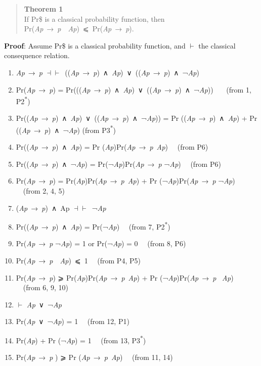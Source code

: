 \documentclass[
  10pt,
  letterpaper,
  DIV=11,
  numbers=noendperiod,
  twoside]{scrartcl}
\providecommand{\tightlist}{%
  \setlength{\itemsep}{0pt}\setlength{\parskip}{0pt}}\usepackage{longtable,booktabs,array}
\begin{document}
\begin{quote}
\textbf{Theorem 1}\\
If Pr\$ is a classical probability function, then\\
Pr(\emph{Ap}~→~\emph{p}~\textbar~\emph{Ap})~⩽~Pr(\emph{Ap}~→~\emph{p}).
\end{quote}

\textbf{Proof}: Assume Pr\$ is a classical probability function, and
\(\vdash\) the classical consequence relation.

\begin{enumerate}
\def\labelenumi{\arabic{enumi}.}
\tightlist
\item
  \emph{Ap}~→~\emph{p}
  \(\dashv \vdash\)~((\emph{Ap}~→~\emph{p})~∧~\emph{Ap})~∨~((\emph{Ap}~→~\emph{p})~∧~¬\emph{Ap})
\item
  Pr(\emph{Ap}~→~\emph{p}) =
  Pr(((\emph{Ap}~→~\emph{p})~∧~\emph{Ap})~∨~((\emph{Ap}~→~\emph{p})~∧~¬\emph{Ap}))
  ~~~(from 1, P2\textsuperscript{*})
\item
  Pr((\emph{Ap}~→~\emph{p})~∧~\emph{Ap})~∨~((\emph{Ap}~→~\emph{p})~∧~¬\emph{Ap}))
  = Pr ((\emph{Ap}~→~\emph{p})~∧~\emph{Ap}) + Pr
  ((\emph{Ap}~→~\emph{p})~∧~¬\emph{Ap}) (from P3\textsuperscript{*})
\item
  Pr((\emph{Ap}~→~\emph{p})~∧~\emph{Ap}) = Pr
  (\emph{Ap})Pr(\emph{Ap}~→~\emph{p}\textbar~\emph{Ap}) ~~(from P6)
\item
  Pr((\emph{Ap}~→~\emph{p})~∧~¬\emph{Ap}) =
  Pr(¬\emph{Ap})Pr(\emph{Ap}~→~\emph{p} \textbar¬\emph{Ap}) ~~(from P6)
\item
  Pr(\emph{Ap}~→~\emph{p}) =
  Pr(\emph{Ap})Pr(\emph{Ap}~→~\emph{p}\textbar~\emph{Ap}) + Pr
  (¬\emph{Ap})Pr(\emph{Ap}~→~\emph{p} \textbar¬\emph{Ap}) ~~(from 2, 4,
  5)
\item
  (\emph{Ap}~→~\emph{p})~∧~Ap \(\dashv \vdash\)~¬\emph{Ap}
\item
  Pr((\emph{Ap}~→~\emph{p})~∧~\emph{Ap}) = Pr(¬\emph{Ap}) ~~(from 7,
  P2\textsuperscript{*})
\item
  Pr(\emph{Ap}~→~\emph{p} \textbar¬\emph{Ap}) = 1 or Pr(¬\emph{Ap}) = 0
  ~~(from 8, P6)
\item
  Pr(\emph{Ap}~→~\emph{p}~\textbar~\emph{Ap})~⩽~1 ~~(from P4, P5)
\item
  Pr(\emph{Ap}~→~\emph{p}) ⩾
  Pr(\emph{Ap})Pr(\emph{Ap}~→~\emph{p}\textbar~\emph{Ap}) + Pr
  (¬\emph{Ap})Pr(\emph{Ap}~→~\emph{p} \textbar~\emph{Ap}) ~~(from 6, 9,
  10)
\item
  \(\vdash\) \emph{Ap}~∨~¬\emph{Ap} ~~
\item
  Pr(\emph{Ap}~∨~¬\emph{Ap}) = 1 ~~(from 12, P1)
\item
  Pr(\emph{Ap}) + Pr (¬\emph{Ap}) = 1 ~~(from 13, P3\textsuperscript{*})
\item
  Pr(\emph{Ap}~→~\emph{p} ) ⩾ Pr
  (\emph{Ap}~→~\emph{p}\textbar~\emph{Ap}) ~~(from 11, 14)
\end{enumerate}
\end{document}
